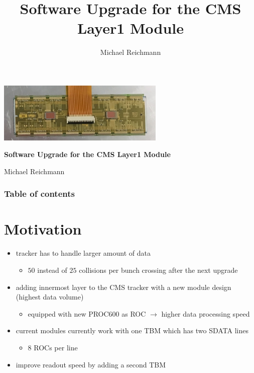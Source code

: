 \documentclass[9pt]{beamer}
\title[Layer1 Module Soft]{Software Upgrade for the CMS Layer1 Module}
\author[M. Reichmann]{Michael Reichmann}
\institute[\textbf{\textit{ETH}}\scalebox{.6}{\textit{Z\"{u}rich}}]{Swiss Federal Institute of Technology Zurich}
\begin{document}
\begin{frame}
	\begin{center}
		\includegraphics[width=8cm]{Mod}
	\end{center}
	\begin{alertblock}{
		\begin{center}
			\textbf{Software Upgrade for the CMS Layer1 Module}
		\end{center}}
		\vspace*{10pt}
		\begin{center}\small
		Michael Reichmann
		\end{center}\normalsize
	\end{alertblock}
\end{frame}
\begin{frame}[allowframebreaks]
	\frametitle{Table of contents}
	\tableofcontents   %
\end{frame}
\section{Motivation}
\begin{frame}
	\begin{itemize}
		\setlength{\itemsep}{\fill}
		\item tracker has to handle larger amount of data
		\begin{itemize}
			\item $50$ instead of $25$ collisions per bunch crossing after the next upgrade
		\end{itemize}
		\item adding innermost layer to the CMS tracker with a new module design (highest data volume)
		\begin{itemize}
			\item equipped with new PROC600 as ROC $\rightarrow$ higher data processing speed
		\end{itemize}
		\item current modules currently work with one TBM which has two SDATA lines
		\begin{itemize}
			\item $8$ ROCs per line
		\end{itemize}
		\item improve readout speed by adding a second TBM
	\end{itemize}
\end{frame}
\end{document}
